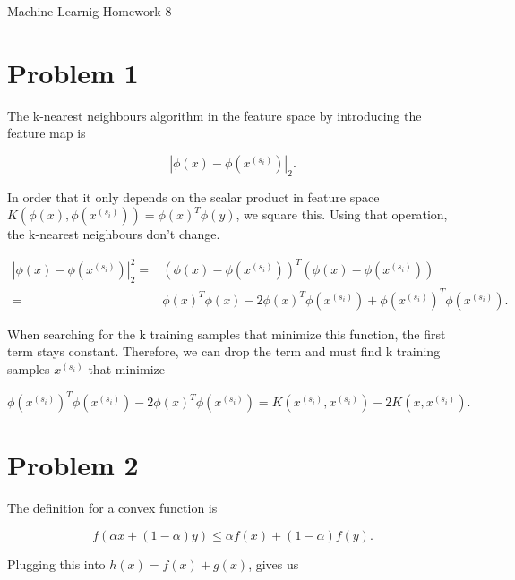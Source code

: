 \documentclass[12pt]{article}
\begin{document}
\begin{center}
{\Large Machine Learnig Homework 8} \\[.3in]
\end{center}
\vspace*{.5in}


\section*{Problem 1}

The k-nearest neighbours algorithm in the feature space by introducing the feature map is 

\begin{equation}
|\phi(x) - \phi(x^{(s_i)})|_2.
\label{eq:}
\end{equation}

In order that it only depends on the scalar product in feature space $K(\phi(x),\phi(x^{(s_i)})) = \phi(x)^T\phi(y)$, we square this. Using that operation, the k-nearest neighbours don't change.


\begin{align}
|\phi(x) - \phi(x^{(s_i)})|_2^2 =& (\phi(x) - \phi(x^{(s_i)}))^T(\phi(x) - \phi(x^{(s_i)})) \\
=& \phi(x)^T\phi(x) -2\phi(x)^T\phi(x^{(s_i)}) + \phi(x^{(s_i)})^T\phi(x^{(s_i)}).
\label{eq:}
\end{align}


When searching for the k training samples that minimize this function, the first term stays constant. Therefore, we can drop the term and must find k training samples $x^{(s_i)}$ that minimize 

\begin{equation}
 \phi(x^{(s_i)})^T\phi(x^{(s_i)})-2\phi(x)^T\phi(x^{(s_i)}) = K(x^{(s_i)}, x^{(s_i)}) - 2K(x, x^{(s_i)}).
\end{equation}

\section*{Problem 2}

The definition for a convex function is 

\begin{equation}
f(\alpha x + (1-\alpha)y) \leq \alpha f(x) +(1-\alpha)f(y).
\end{equation}

Plugging this into $h(x) = f(x)+g(x)$, gives us
\end{document}
